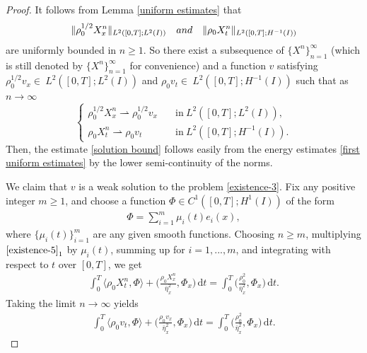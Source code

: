 \documentclass[11pt, reqno]{amsart}
\newcommand{\diff}{\mathrm{d}}
\numberwithin{equation}{section}
\begin{document}
{\begin{proof}
It follows from  Lemma \ref{uniform estimates} that
\begin{equation*}
	\begin{aligned}
	\|\rho_0^{1/2}X_x^n\|_{L^2([0,T];L^2(I))}\quad {\rm{and}}\quad \|\rho_0 X_t^n\|_{L^2([0,T];H^{-1}(I))}
	\end{aligned}
\end{equation*}	
are uniformly bounded in \(n\geq 1\).  So there exist a subsequence of \(\{X^n\}_{n=1}^\infty\) (which is still denoted by \(\{X^n\}_{n=1}^\infty\) for convenience) and a function \(v\) satisfying \(\rho_0^{1/2}v_x \in\ L^2([0,T];L^2(I))\) and \(\rho_0v_t \in\ L^2([0,T];H^{-1}(I))\) such that as \(n\to\infty\)
\begin{equation*}
	\begin{cases}
		\rho_0^{1/2}X_x^n\rightharpoonup \rho_0^{1/2}v_x &\quad \text{in}\ L^2([0,T];L^2(I)),\\
		\rho_0X_t^n\rightharpoonup \rho_0v_t &\quad \text{in}\ L^2([0,T];H^{-1}(I)).	
	\end{cases}
\end{equation*}	
Then, the estimate \eqref{solution bound} follows easily from the energy estimates \eqref{first uniform estimates} by the lower semi-continuity of the norms.

We claim that \(v\) is a weak solution to the problem \eqref{existence-3}. Fix any positive integer \(m\geq 1\), and choose a function  \(\Phi\in C^1([0,T]; H^1(I))\)
of the form 
	\begin{equation}\label{existence-14}
	\begin{aligned}
		\Phi=\sum_{i=1}^m\mu_i(t)e_i(x),
	\end{aligned}
\end{equation}	
where \(\{\mu_i(t)\}_{i=1}^m\) are any given smooth functions. Choosing \(n\geq m\), multiplying \(\eqref{existence-5}_1\) by \(\mu_i(t)\), summing up for \(i=1,...,m\), and integrating with respect to \(t\) over \([0,T]\), we get
\begin{equation}\label{existence-15}
	\begin{aligned}
		\int_0^T\langle\rho_0X_t^n, \Phi\rangle+\bigg(\frac{\rho_0X_x^n}{\bar{\eta}_x^2}, \Phi_x\bigg)\,\diff t=\int_0^T\bigg({\frac{\rho_0^2}{\bar{\eta}_x^2}}, \Phi_x\bigg)\,\diff t.
	\end{aligned}
\end{equation}
Taking the limit \(n\rightarrow\infty\) yields
\begin{equation}\label{existence-16}
	\begin{aligned}
		\int_0^T\langle\rho_0v_t, \Phi\rangle+\bigg(\frac{\rho_0v_x}{\bar{\eta}_x^2}, \Phi_x\bigg)\,\diff t=\int_0^T\bigg({\frac{\rho_0^2}{\bar{\eta}_x^2}}, \Phi_x\bigg)\,\diff t.
	\end{aligned}
\end{equation}


\end{proof}}
\end{document}
